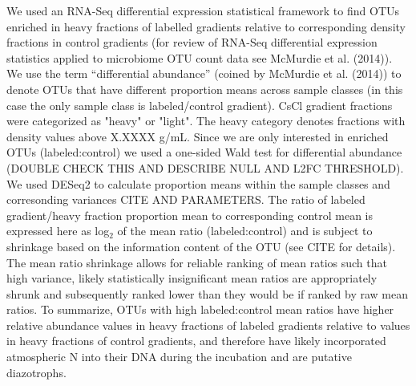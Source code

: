 We used an RNA-Seq differential expression statistical framework to find OTUs enriched in heavy fractions of labelled gradients relative to corresponding density fractions in control gradients (for review of RNA-Seq differential expression statistics applied to microbiome OTU count data see McMurdie et al. (2014)). We use the term “differential abundance” (coined by McMurdie et al. (2014)) to denote OTUs that have different proportion means across sample classes (in this case the only sample class is labeled/control gradient). CsCl gradient fractions were categorized as "heavy" or "light". The heavy category denotes fractions with density values above X.XXXX g/mL. Since we are only interested in enriched OTUs (labeled:control) we used a one-sided Wald test for differential abundance (DOUBLE CHECK THIS AND DESCRIBE NULL AND L2FC THRESHOLD). We used DESeq2 to calculate proportion means within the sample classes and corresonding variances CITE AND PARAMETERS. The ratio of labeled gradient/heavy fraction proportion mean to corresponding control mean is expressed here as log$_{2}$ of the mean ratio (labeled:control) and is subject to shrinkage based on the information content of the OTU (see CITE for details). The mean ratio shrinkage allows for reliable ranking of mean ratios such that high variance, likely statistically insignificant mean ratios are appropriately shrunk and subsequently ranked lower than they would be if ranked by raw mean ratios. To summarize, OTUs with high labeled:control mean ratios have higher relative abundance values in heavy fractions of labeled gradients relative to values in heavy fractions of control gradients, and therefore have likely incorporated atmospheric N into their DNA during the incubation and are putative diazotrophs.


